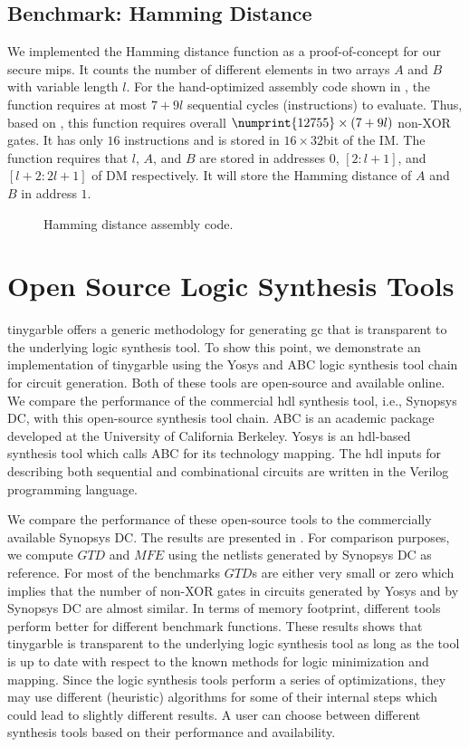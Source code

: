 \subsection{Benchmark: Hamming Distance}
We implemented the Hamming distance function as a proof-of-concept for our secure \gls{mips}.
It counts the number of different elements in two arrays $A$ and $B$ with variable length $l$.
For the hand-optimized assembly code shown in , the function requires at most $7+9l$ sequential cycles (instructions) to evaluate.
Thus, based on , this function requires overall $\numprint{12755}\times(7+9l)$ non-XOR gates.
It has only $16$ instructions and is stored in $16\times32$bit of the IM.
The function requires that $l$, $A$, and $B$ are stored in addresses $0$, $[2:l+1]$, and $[l+2:2l+1]$ of DM respectively.
It will store the Hamming distance of $A$ and $B$ in address $1$.

\begin{figure}[ht]

\caption{Hamming distance assembly code.}\label{figure:hamminassembly}
\end{figure}

\section{Open Source Logic Synthesis Tools}
\gls{tinygarble} offers a generic methodology for generating \acrshort{gc} that is transparent to the underlying logic synthesis tool.
To show this point, we demonstrate an implementation of \gls{tinygarble} using the Yosys \cite{tool:Yosys} and ABC \cite{tool:ABC} logic synthesis tool chain for circuit generation.
Both of these tools are open-source and available online.
We compare the performance of the commercial \acrshort{hdl} synthesis tool, i.e., Synopsys DC, with this open-source synthesis tool chain.
ABC is an academic package developed at the University of California Berkeley.
Yosys is an \acrshort{hdl}-based synthesis tool which calls ABC for its technology mapping.
The \acrshort{hdl} inputs for describing both sequential and combinational circuits are written in the Verilog programming language.

We compare the performance of these open-source tools to the commercially available Synopsys DC.
The results are presented in .
For comparison purposes, we compute $\mathit{GTD}$ and $\mathit{MFE}$ using the netlists generated by Synopsys DC as reference.
For most of the benchmarks $\mathit{GTD}$s are either very small or zero which implies that the number of non-XOR gates in circuits generated by Yosys and by Synopsys DC are almost similar.
In terms of memory footprint, different tools perform better for different benchmark functions.
These results shows that \gls{tinygarble} is transparent to the underlying logic synthesis tool as long as the tool is up to date with respect to the known methods for logic minimization and mapping.
Since the logic synthesis tools perform a series of optimizations, they may use different (heuristic) algorithms for some of their internal steps which could lead to slightly different results.
A user can choose between different synthesis tools based on their performance and availability.

